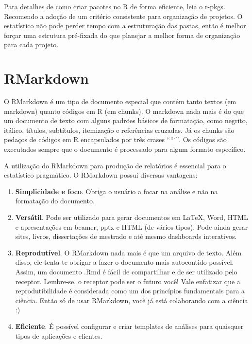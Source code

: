 \documentclass[]{book}
\providecommand{\tightlist}{%
  \setlength{\itemsep}{0pt}\setlength{\parskip}{0pt}}
\begin{document}
Para detalhes de como criar pacotes no R de forma eficiente, leia o
\href{http://r-pkgs.had.co.nz}{r-pkgs}. Recomendo a adoção de um
critério consistente para organização de projetos. O estatístico não
pode perder tempo com a estruturação das pastas, então é melhor forçar
uma estrutura pré-fixada do que planejar a melhor forma de organização
para cada projeto.

\section{RMarkdown}\label{rmarkdown}

O RMarkdown é um tipo de documento especial que contém tanto textos (em
markdown) quanto códigos em R (em chunks). O markdown nada mais é do que
um documento de texto com alguns padrões básicos de formatação, como
negrito, itálico, títulos, subtítulos, itemização e referências
cruzadas. Já os chunks são pedaços de códigos em R encapsulados por três
crases `````''. Os códigos são executados sempre que o documento é
processado para algum formato específico.

A utilização do RMarkdown para produção de relatórios é essencial para o
estatístico pragmático. O RMarkdown possui diversas vantagens:

\begin{enumerate}
\def\labelenumi{\arabic{enumi}.}
\tightlist
\item
  \textbf{Simplicidade e foco}. Obriga o usuário a focar na análise e
  não na formatação do documento.
\item
  \textbf{Versátil}. Pode ser utilizado para gerar documentos em LaTeX,
  Word, HTML e apresentações em beamer, pptx e HTML (de vários tipos).
  Pode ainda gerar sites, livros, dissertações de mestrado e até mesmo
  dashboards interativos.
\item
  \textbf{Reprodutível}. O RMarkdown nada mais é que um arquivo de
  texto. Além disso, ele tenta te obrigar a fazer o documento mais
  autocontido possível. Assim, um documento .Rmd é fácil de compartilhar
  e de ser utilizado pelo receptor. Lembre-se, o receptor pode ser o
  futuro você! Vale enfatizar que a reprodutibilidade é considerada como
  um dos princípios fundamentais para a ciência. Então só de usar
  RMarkdown, você já está colaborando com a ciência :)
\item
  \textbf{Eficiente}. É possível configurar e criar templates de
  análises para quaisquer tipos de aplicações e clientes.
\end{enumerate}
\end{document}
